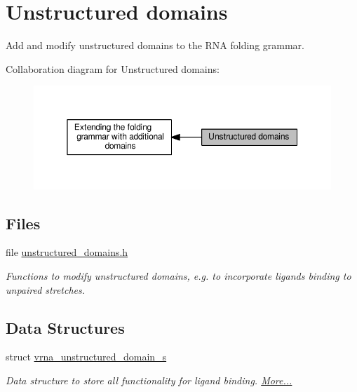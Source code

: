 \hypertarget{group__domains__up}{}\section{Unstructured domains}
\label{group__domains__up}


Add and modify unstructured domains to the R\+NA folding grammar.  


Collaboration diagram for Unstructured domains\+:
\nopagebreak
\begin{figure}[H]
\begin{center}
\leavevmode
\includegraphics[width=350pt]{group__domains__up}
\end{center}
\end{figure}
\subsection*{Files}
\begin{DoxyCompactItemize}
\item 
file \hyperlink{unstructured__domains_8h}{unstructured\+\_\+domains.\+h}
\begin{DoxyCompactList}\small\item\em Functions to modify unstructured domains, e.\+g. to incorporate ligands binding to unpaired stretches. \end{DoxyCompactList}\end{DoxyCompactItemize}
\subsection*{Data Structures}
\begin{DoxyCompactItemize}
\item 
struct \hyperlink{group__domains__up_structvrna__unstructured__domain__s}{vrna\+\_\+unstructured\+\_\+domain\+\_\+s}
\begin{DoxyCompactList}\small\item\em Data structure to store all functionality for ligand binding.  \hyperlink{group__domains__up_structvrna__unstructured__domain__s}{More...}\end{DoxyCompactList}\end{DoxyCompactItemize}
